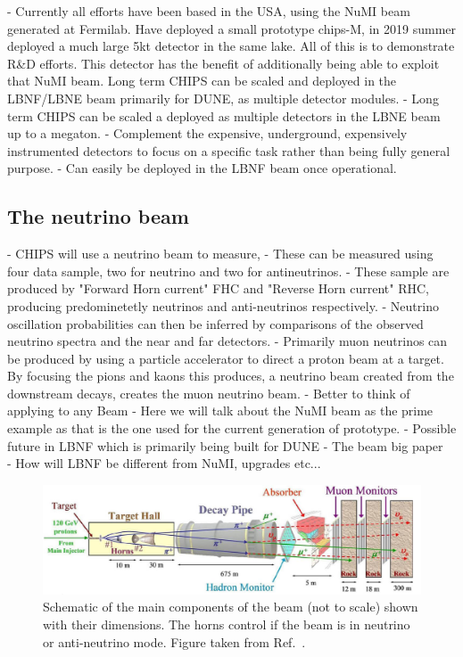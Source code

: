- Currently all efforts have been based in the USA, using the NuMI beam generated at Fermilab.
Have deployed a small prototype chips-M, in 2019 summer deployed a much large 5kt detector in the
same lake. All of this is to demonstrate R\&D efforts. This detector has the benefit of
additionally being able to exploit that NuMI beam. Long term CHIPS can be scaled and deployed in
the LBNF/LBNE beam primarily for DUNE, as multiple detector modules.
- Long term CHIPS can be scaled a deployed as multiple detectors in the LBNE beam up to a megaton.
- Complement the expensive, underground, expensively instrumented detectors to focus on a specific
task rather than being fully general purpose.
- Can easily be deployed in the LBNF beam once operational.

\subsection{The neutrino beam} %
\label{sec:chips_concept_beam} %

- CHIPS will use a neutrino beam to measure,
- These can be measured using four data sample, two for neutrino and two for antineutrinos.
- These sample are produced by "Forward Horn current" FHC and "Reverse Horn current" RHC,
producing predominetetly neutrinos and anti-neutrinos respectively.
- Neutrino oscillation probabilities can then be inferred by comparisons of the observed neutrino
spectra and the near and far detectors.
- Primarily muon neutrinos can be produced by using a particle accelerator to direct a proton beam
at a target. By focusing the pions and kaons this produces, a neutrino beam created from the
downstream decays, creates the muon neutrino beam.
- Better to think of \chips applying to any Beam
- Here we will talk about the NuMI beam as the prime example as that is the one used for the
current generation of \chips prototype.
- Possible future \chips in LBNF which is primarily being built for DUNE
- The \numi beam big paper~\cite{adamson2016}
- How will LBNF be different from NuMI, upgrades etc...

\begin{figure} %
    \includegraphics[width=\textwidth]{diagrams/4-chips/numi_beam.png}
    \caption[Schematic of the \numi beam.]
    {Schematic of the main components of the \numi beam (not to scale) shown with their
        dimensions. The horns control if the beam is in neutrino or anti-neutrino mode. Figure
        taken from Ref.~\cite{adamson2016}.}
    \label{fig:numi_beam}
\end{figure}

